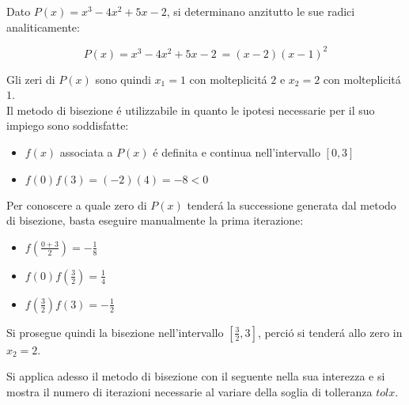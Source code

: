 \begin{center}
\footnotesize\noindent{}\end{center}

Dato \(P(x) = x^3 - 4x^2 + 5x - 2\), si determinano anzitutto le sue radici analiticamente:

\[
P(x) = x^3 - 4x^2 + 5x - 2\ = (x-2)(x-1)^2
\]

\noindent Gli zeri di \(P(x)\) sono quindi \(x_1=1\) con molteplicit\'a \(2\) e \(x_2=2\) con molteplicit\'a \(1\).\\

\noindent Il metodo di bisezione \'e utilizzabile in quanto le ipotesi necessarie per il suo impiego sono soddisfatte:

\begin{itemize}

\item \(f(x)\) associata a \(P(x)\) \'e definita e continua nell'intervallo \([0,3]\)
\item \(f(0)f(3) = (-2)(4) = -8 < 0\)

\end{itemize}

\noindent Per conoscere a quale zero di \(P(x)\) tender\'a la successione generata dal metodo di bisezione, basta eseguire manualmente la prima iterazione:

\begin{itemize}
\item \(f(\frac{0+3}{2}) = -\frac{1}{8}\)
\item \(f(0)f(\frac{3}{2}) = \frac{1}{4}\)
\item \(f(\frac{3}{2})f(3) = -\frac{1}{2}\)
\end{itemize}

\noindent Si prosegue quindi la bisezione nell'intervallo \([\frac{3}{2}, 3]\), perci\'o si tender\'a allo zero in \(x_2=2\).

\noindent Si applica adesso il metodo di bisezione con il seguente nella sua interezza e si mostra il numero di iterazioni necessarie al variare della soglia di tolleranza \(tolx\).\\

